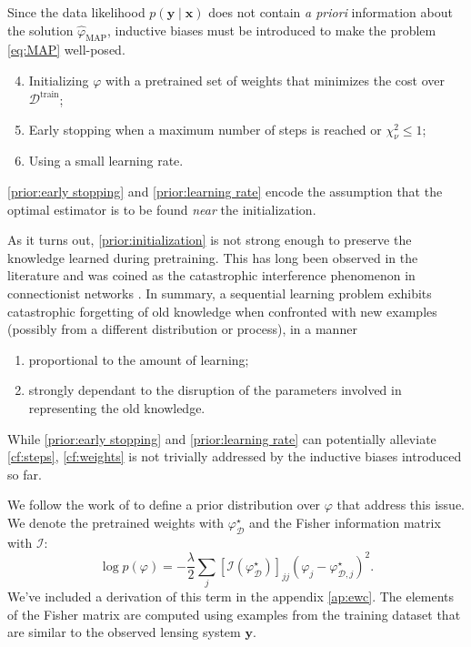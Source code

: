 \documentclass[twocolumn]{aastex631}
\newcommand{\subscript}[2]{$#1 _ #2$}
\begin{document}
Since the data likelihood $p(\mathbf{y} \mid \mathbf{x})$ 
does not contain \textit{a priori} information 
about the solution $\hat{\varphi}_{\mathrm{MAP}}$,
inductive biases must be introduced to make 
the problem \eqref{eq:MAP} well-posed. 
\begin{enumerate}[label=(\subscript{\mathcal{H}}{{\arabic*}})]
        \setcounter{enumi}{3}
        \item \label{prior:initialization} Initializing $\varphi$ with a pretrained set of weights 
                that minimizes the cost over $\mathcal{D}^{\mathrm{train}}$; 
        \item \label{prior:early stopping} Early stopping when a maximum number of steps is reached or 
                $\chi^2_\nu \leq 1$;
        \item \label{prior:learning rate} Using a small learning rate.
\end{enumerate}
\ref{prior:early stopping} and \ref{prior:learning rate} encode the assumption 
that the optimal estimator is to be found \textit{near} the initialization.

As it turns out, \ref{prior:initialization} is not strong 
enough to preserve the knowledge learned during pretraining. 
This has long been observed in the literature and was coined as the 
catastrophic interference phenomenon in 
connectionist networks \citep{McCloskey1989,Ratcliff1990}.
In summary, a sequential learning problem exhibits catastrophic 
forgetting of old knowledge when confronted with new examples (possibly 
from a different distribution or process), in a manner 
\begin{enumerate}[label=(\subscript{\mathrm{CF}}{{\arabic*}})]
        \item \label{cf:steps} proportional to the amount of learning;
        \item \label{cf:weights} strongly dependant to the disruption of the parameters
                involved in representing the old knowledge.
\end{enumerate}
While \ref{prior:early stopping} and \ref{prior:learning rate} can 
potentially alleviate \ref{cf:steps}, \ref{cf:weights} is not 
trivially addressed by the inductive biases introduced so far.

We follow the work of \citet{Kirkpatrick2016} to define a prior distribution
over $\varphi$ that address this issue.
We denote the pretrained weights with $\varphi_{\mathcal{D}}^{\star}$ 
and the Fisher information matrix with $\mathcal{I}$:
\begin{equation}\label{eq:Prior} 
        \log p(\varphi) = -\frac{\lambda}{2}\sum_{j} [\mathcal{I}(\varphi_{\mathcal{D}}^{\star})]_{jj} 
        (\varphi_j - \varphi_{\mathcal{D},j}^{\star})^{2}.
\end{equation} 
We've included a derivation 
of this term in the appendix \ref{ap:ewc}. 
The elements of the Fisher 
matrix are computed using examples from the training 
dataset that are similar to the observed lensing system 
$\mathbf{y}$. 
\end{document}

